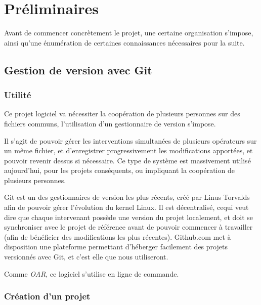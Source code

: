 
\section{Préliminaires}
\label{sec:preliminaires}

\par Avant de commencer concrètement le projet, une certaine organisation s'impose, ainsi qu'une énumération de certaines connaissances nécessaires pour la suite. 

\subsection{Gestion de version avec Git}
\label{sec:gestion-de-version}

\subsubsection{Utilité}
\label{sec:utilite}

\par Ce projet logiciel va nécessiter la coopération de plusieurs personnes sur des fichiers communs, l'utilisation d'un gestionnaire de version s'impose. 
\par Il s'agit de pouvoir gérer les interventions simultanées de plusieurs opérateurs sur un même fichier, et d'enregistrer progressivement les modifications apportées, et pouvoir revenir dessus si nécessaire. Ce type de système est massivement utilisé aujourd'hui, pour les projets conséquents, ou impliquant la coopération de plusieurs personnes.
\par Git est un des gestionnaires de version les plus récents, créé par Linus Torvalds afin de pouvoir gérer l'évolution du kernel Linux. Il est décentralisé, cequi veut dire que chaque intervenant possède une version du projet localement, et doit se synchroniser avec le projet de référence avant de pouvoir commencer à travailler (afin de bénéficier des modifications les plus récentes). Github.com met à disposition une plateforme permettant d'héberger facilement des projets versionnés avec Git, et c'est elle que nous utiliseront.

\par Comme \emph{OAR}, ce logiciel s'utilise en ligne de commande.

\subsubsection{Création d'un projet}
\label{sec:creation-dun-projet}

